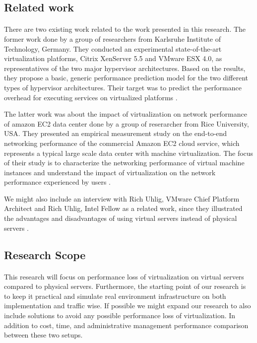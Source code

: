 \subsection{Related work}
\paragraph{}
There are two existing work related to the work presented in this research. The former work done by a group of researchers from Karlsruhe Institute of Technology, Germany. They conducted an experimental  state-of-the-art virtualization platforms, Citrix XenServer 5.5 and VMware ESX 4.0, as representatives of the two major hypervisor architectures. Based on the results, they propose a basic, generic performance prediction model for the two different types of hypervisor architectures. Their target was to predict the performance overhead for executing services on virtualized platforms \cite{rw1}.\\
\par\indent
The latter work was about the impact of virtualization on network performance of amazon EC2 data center done by a group of reserarcher from Rice University, USA. They presented an empirical measurement study on the end-to-end networking performance of the commercial Amazon EC2 cloud service, which represents a typical large scale data center with machine virtualization. The focus of their study is to characterize the networking performance of virtual machine instances and understand the impact of virtualization on the network performance experienced by users \cite{rw2}.\\
\par\indent
We might also include an interview with Rich Uhlig, VMware Chief Platform Architect and Rich Uhlig, Intel Fellow as a related work, since they illustrated the advantages and disadvantages of using virtual servers instead of physical servers \cite{rw3}.

\subsection{Research Scope}
\paragraph{}
This research will focus on performance loss of virtualization on virtual servers compared to physical servers. Furthermore, the starting point of our research is to keep it practical and simulate real environment infrastructure on both implementation and traffic wise. If possible we might expand our research to also include solutions to avoid any possible performance loss of virtualization. In addition to cost, time, and administrative management performance comparison between these two setups.   


